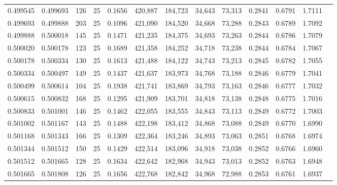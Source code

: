\begin{tabular}{rrrrrrrrrrrrr}
0.499545 & 0.499693 &   126 &  25 &                                     0.1656 & 420,887 & 184,723 &  34,643 &  73,313 & 0.2841 & 0.6791 & 1.7111 \\
0.499693 & 0.499888 &   203 &  25 &                                     0.1096 & 421,090 & 184,520 &  34,668 &  73,288 & 0.2843 & 0.6789 & 1.7092 \\
0.499888 & 0.500018 &   145 &  25 &                                     0.1471 & 421,235 & 184,375 &  34,693 &  73,263 & 0.2844 & 0.6786 & 1.7079 \\
0.500020 & 0.500178 &   123 &  25 &                                     0.1689 & 421,358 & 184,252 &  34,718 &  73,238 & 0.2844 & 0.6784 & 1.7067 \\
0.500178 & 0.500334 &   130 &  25 &                                     0.1613 & 421,488 & 184,122 &  34,743 &  73,213 & 0.2845 & 0.6782 & 1.7055 \\
0.500334 & 0.500497 &   149 &  25 &                                     0.1437 & 421,637 & 183,973 &  34,768 &  73,188 & 0.2846 & 0.6779 & 1.7041 \\
0.500499 & 0.500614 &   104 &  25 &                                     0.1938 & 421,741 & 183,869 &  34,793 &  73,163 & 0.2846 & 0.6777 & 1.7032 \\
0.500615 & 0.500832 &   168 &  25 &                                     0.1295 & 421,909 & 183,701 &  34,818 &  73,138 & 0.2848 & 0.6775 & 1.7016 \\
0.500833 & 0.501001 &   146 &  25 &                                     0.1462 & 422,055 & 183,555 &  34,843 &  73,113 & 0.2849 & 0.6772 & 1.7003 \\
0.501002 & 0.501167 &   143 &  25 &                                     0.1488 & 422,198 & 183,412 &  34,868 &  73,088 & 0.2849 & 0.6770 & 1.6990 \\
0.501168 & 0.501343 &   166 &  25 &                                     0.1309 & 422,364 & 183,246 &  34,893 &  73,063 & 0.2851 & 0.6768 & 1.6974 \\
0.501344 & 0.501512 &   150 &  25 &                                     0.1429 & 422,514 & 183,096 &  34,918 &  73,038 & 0.2852 & 0.6766 & 1.6960 \\
0.501512 & 0.501665 &   128 &  25 &                                     0.1634 & 422,642 & 182,968 &  34,943 &  73,013 & 0.2852 & 0.6763 & 1.6948 \\
0.501665 & 0.501808 &   126 &  25 &                                     0.1656 & 422,768 & 182,842 &  34,968 &  72,988 & 0.2853 & 0.6761 & 1.6937 \\

\end{tabular}
